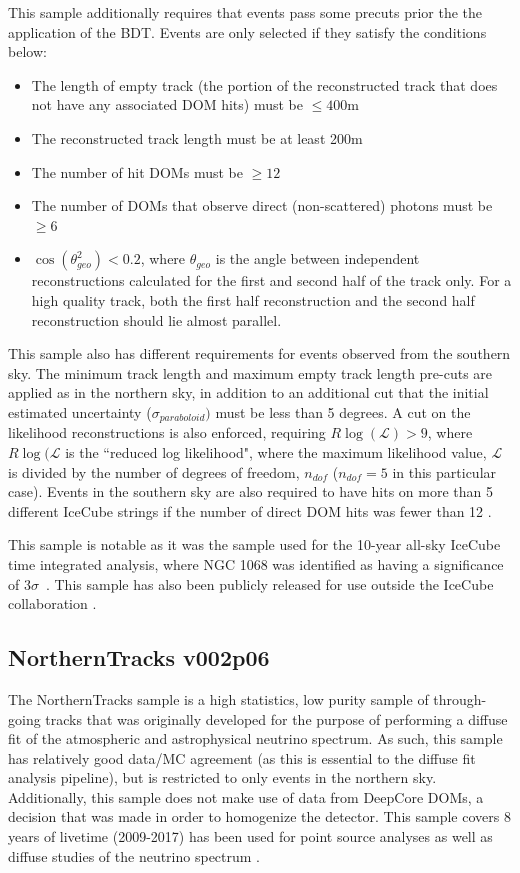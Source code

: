 This sample additionally requires that events pass some precuts prior the the application of the BDT. Events are only selected if they satisfy the conditions below:

\begin{itemize}
    \item The length of empty track (the portion of the reconstructed track that does not have any associated DOM hits) must be $\leq 400$m
    \item The reconstructed track length must be at least 200m
    \item The number of hit DOMs must be $\geq 12$
    \item The number of DOMs that observe direct (non-scattered) photons must be $\geq 6$
    \item $\cos(\theta_{geo}^2) < 0.2$, where $\theta_{geo}$ is the angle between independent reconstructions calculated for the first and second half of the track only. For a high quality track, both the first half reconstruction and the second half reconstruction should lie almost parallel. 
\end{itemize}

This sample also has different requirements for events observed from the southern sky. The minimum track length and maximum empty track length pre-cuts are applied as in the northern sky, in addition to an additional cut that the initial estimated uncertainty ($\sigma_{paraboloid})$ must be less than 5 degrees. A cut on the likelihood reconstructions is also enforced, requiring $R\log(\mathcal{L}) > 9$, where $R\log(\mathcal{L}$ is the ``reduced log likelihood", where the maximum likelihood value, $\mathcal{L}$ is divided by the number of degrees of freedom, $n_{dof}$ ($n_{dof} = 5$ in this particular case). Events in the southern sky are also required to have hits on more than 5 different IceCube strings if the number of direct DOM hits was fewer than 12 \cite{TessaThesis}. 

This sample is notable as it was the sample used for the 10-year all-sky IceCube time integrated analysis, where NGC 1068 was identified as having a significance of $3 \sigma$~\cite{10yr_tint}. This sample has also been publicly released for use outside the IceCube collaboration \cite{10yrpublicdata}.

\subsection{NorthernTracks v002p06}
The NorthernTracks sample is a high statistics, low purity sample of through-going tracks that was originally developed for the purpose of performing a diffuse fit of the atmospheric and astrophysical neutrino spectrum. As such, this sample has relatively good data/MC agreement (as this is essential to the diffuse fit analysis pipeline), but is restricted to only events in the northern sky. Additionally, this sample does not make use of data from DeepCore DOMs,  a decision that was made in order to homogenize the detector. This sample covers 8 years of livetime (2009-2017) has been used for point source analyses as well as diffuse studies of the neutrino spectrum \cite{NorthernTracks_PS}. 

